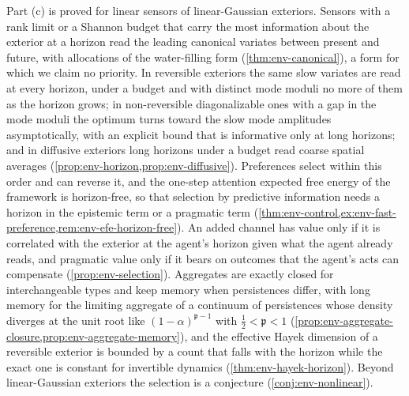 Part (c) is proved for linear sensors of linear-Gaussian exteriors. Sensors with a rank limit or a Shannon budget that carry the most information about the exterior at a horizon read the leading canonical variates between present and future, with allocations of the water-filling form (\cref{thm:env-canonical}), a form for which we claim no priority. In reversible exteriors the same slow variates are read at every horizon, under a budget and with distinct mode moduli no more of them as the horizon grows; in non-reversible diagonalizable ones with a gap in the mode moduli the optimum turns toward the slow mode amplitudes asymptotically, with an explicit bound that is informative only at long horizons; and in diffusive exteriors long horizons under a budget read coarse spatial averages (\cref{prop:env-horizon,prop:env-diffusive}). Preferences select within this order and can reverse it, and the one-step attention expected free energy of the framework is horizon-free, so that selection by predictive information needs a horizon in the epistemic term or a pragmatic term (\cref{thm:env-control,ex:env-fast-preference,rem:env-efe-horizon-free}). An added channel has value only if it is correlated with the exterior at the agent's horizon given what the agent already reads, and pragmatic value only if it bears on outcomes that the agent's acts can compensate (\cref{prop:env-selection}). Aggregates are exactly closed for interchangeable types and keep memory when persistences differ, with long memory for the limiting aggregate of a continuum of persistences whose density diverges at the unit root like $(1-\alpha)^{\mathfrak p-1}$ with $\frac12<\mathfrak p<1$ (\cref{prop:env-aggregate-closure,prop:env-aggregate-memory}), and the effective Hayek dimension of a reversible exterior is bounded by a count that falls with the horizon while the exact one is constant for invertible dynamics (\cref{thm:env-hayek-horizon}). Beyond linear-Gaussian exteriors the selection is a conjecture (\cref{conj:env-nonlinear}).

